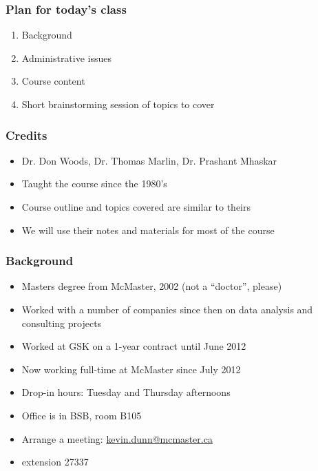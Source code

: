 
\begin{frame}\frametitle{Plan for today's class}
	\begin{enumerate}
		\item	Background
		\item	Administrative issues
		\item	Course content
		\item	Short brainstorming session of topics to cover
	\end{enumerate}
\end{frame}

\begin{frame}\frametitle{Credits}	
	\begin{itemize}
		\item	Dr. Don Woods, Dr. Thomas Marlin, Dr. Prashant Mhaskar
		\item	Taught the course since the 1980's
		\item	Course outline and topics covered are similar to theirs
		\item	We will use their notes and materials for most of the course
	\end{itemize}	
\end{frame}

\begin{frame}\frametitle{Background}
	\begin{itemize}
		\item	Masters degree from McMaster, 2002 (not a ``doctor'', please)
		\item	Worked with a number of companies since then on data analysis and consulting projects
		\item	Worked at GSK on a 1-year contract until June 2012		
		\item	Now working full-time at McMaster since July 2012
		\item	Drop-in hours: Tuesday and Thursday afternoons
		\item	Office is in BSB, room B105
		\item	Arrange a meeting: \url{kevin.dunn@mcmaster.ca}
		\item	extension 27337
	\end{itemize}	
\end{frame}

